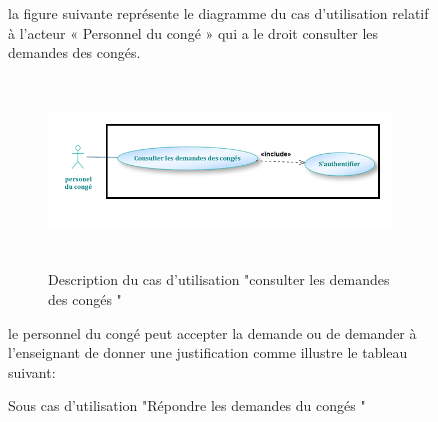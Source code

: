 \documentclass[12 pt]{report}
\begin{document}
\begin{figure}[h]
\begin{center}
\begin{table}[htbp]
\begin{center}
\begin{tabular}{|p{17 cm}|}
\end{tabular}
\end{center}
\end{table}\newpage
la figure suivante représente le diagramme du cas d’utilisation  relatif à l’acteur « Personnel du congé » qui a le droit consulter les demandes des congés.
\begin{figure}[h]
\begin{center}
\includegraphics[width= 12cm , height =5cm]{cas_con_con.PNG}
\caption{Description du cas d'utilisation "consulter les demandes des congés "}
\end{center}
\end{figure}


le personnel du congé peut accepter la demande ou de demander à l'enseignant de donner une justification comme illustre le tableau suivant:
\begin{table}[htbp]
\begin{center}
\caption{ Sous cas d'utilisation "Répondre les demandes du congés "}
 

\end{center}
\end{table}
\end{center}
\end{figure}
\end{document}
